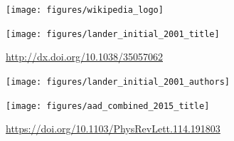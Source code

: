 \documentclass[aspectratio=169]{beamer}
\begin{document}
\begin{frame}
  \titlepage
\end{frame}
\begin{frame}

\begin{center}
\texttt{[image: figures/wikipedia\_logo]}
\end{center}

\end{frame}
\begin{frame}

\begin{center}
\texttt{[image: figures/lander\_initial\_2001\_title]}
\end{center}

\vfill
{\tiny \url{http://dx.doi.org/10.1038/35057062}}

\end{frame}
\begin{frame}

\begin{center}
\texttt{[image: figures/lander\_initial\_2001\_authors]}
\end{center}

\end{frame}
\begin{frame}

\begin{center}
\texttt{[image: figures/aad\_combined\_2015\_title]}
\end{center}

\vfill
{\tiny \url{https://doi.org/10.1103/PhysRevLett.114.191803}}

\end{frame}
\end{document}
